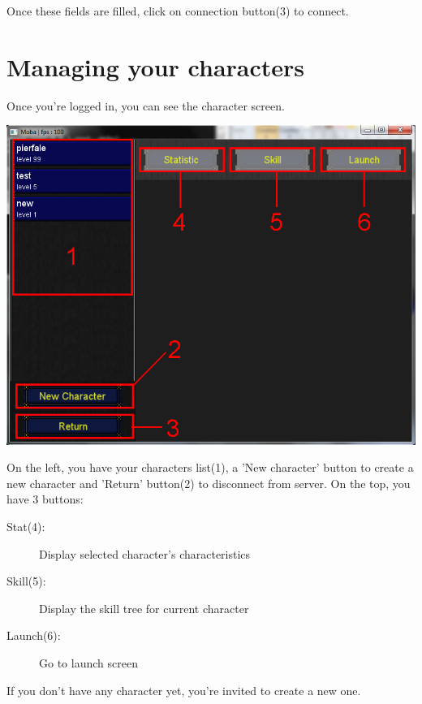 \documentclass{scrreprt}
\begin{document}
			  Once these fields are filled, click on connection button(3) to connect.

			  \section{Managing your characters}
			  Once you're logged in, you can see the character screen.
			  \begin{center}
			  \includegraphics[scale=0.4]{character_screen.png}
			  \end{center}
			  On the left, you have your characters list(1), a 'New character' button to create a new character and 'Return' button(2) to disconnect from server. On the top, you have 3 buttons:
			  \begin{description}
			  \item[Stat(4):]{Display selected character's characteristics}
			  \item[Skill(5):]{Display the skill tree for current character}
			  \item[Launch(6):]{Go to launch screen}
			  \end{description}
			  If you don't have any character yet, you're invited to create a new one.
\end{document}
